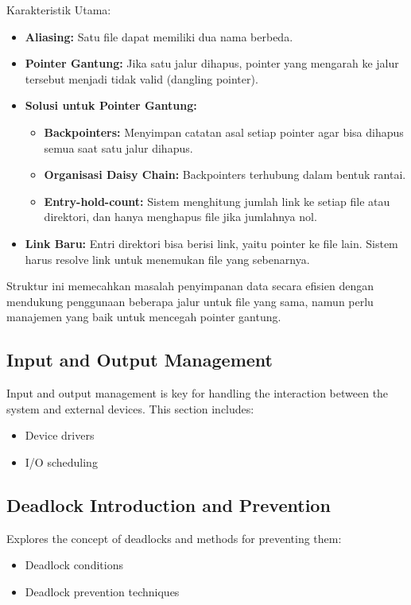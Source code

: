 \documentclass[12pt]{article}
\begin{document}
\begin{itemize}
\begin{enumerate}
\begin{enumerate}[label=\alph*.]
        Karakteristik Utama:
        \begin{itemize}
            \item \textbf{Aliasing:} Satu file dapat memiliki dua nama berbeda.
            \item \textbf{Pointer Gantung:} Jika satu jalur dihapus, pointer yang mengarah ke jalur tersebut menjadi tidak valid (dangling pointer).
            \item \textbf{Solusi untuk Pointer Gantung:}
            \begin{itemize}
                \item \textbf{Backpointers:} Menyimpan catatan asal setiap pointer agar bisa dihapus semua saat satu jalur dihapus.
                \item \textbf{Organisasi Daisy Chain:} Backpointers terhubung dalam bentuk rantai.
                \item \textbf{Entry-hold-count:} Sistem menghitung jumlah link ke setiap file atau direktori, dan hanya menghapus file jika jumlahnya nol.
            \end{itemize}
            \item \textbf{Link Baru:} Entri direktori bisa berisi link, yaitu pointer ke file lain. Sistem harus resolve link untuk menemukan file yang sebenarnya.
        \end{itemize}

        Struktur ini memecahkan masalah penyimpanan data secara efisien dengan mendukung penggunaan beberapa jalur untuk file yang sama, namun perlu manajemen yang baik untuk mencegah pointer gantung.
    \end{enumerate}
\end{enumerate}
\end{itemize}

\subsection{Input and Output Management}
Input and output management is key for handling the interaction between the system and external devices. This section includes:
\begin{itemize}
    \item Device drivers
    \item I/O scheduling
\end{itemize}

\subsection{Deadlock Introduction and Prevention}
Explores the concept of deadlocks and methods for preventing them:
\begin{itemize}
    \item Deadlock conditions
    \item Deadlock prevention techniques
\end{itemize}
\end{document}
